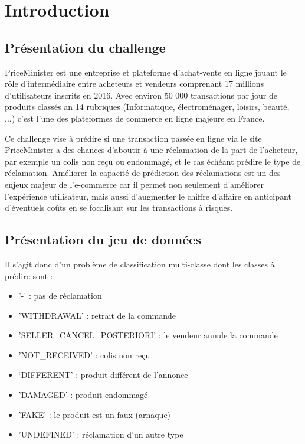 
\chapter{Introduction}

\section{Présentation du challenge}

PriceMinister est une entreprise et plateforme d'achat-vente en ligne jouant le rôle 
d'intermédiaire entre acheteurs et vendeurs comprenant 17 millions d'utilisateurs inscrits
en 2016. Avec environ 50 000 transactions par jour de produits classés an 14 rubriques 
(Informatique, électroménager, loisirs, beauté, ...) c'est l'une des plateformes de commerce
en ligne majeure en France. 

Ce challenge vise à prédire si une transaction passée en ligne via le site PriceMinister
a des chances d'aboutir à une réclamation de la part de l'acheteur, par exemple un colis 
non reçu ou endommagé, et le cas échéant prédire le type de réclamation. Améliorer la 
capacité de prédiction des réclamations est un des enjeux majeur de l'e-commerce car il 
permet non seulement d'améliorer l'expérience utilisateur, mais aussi d'augmenter le chiffre 
d'affaire en anticipant d'éventuels coûts en se focalisant sur les transactions à risques.

\section{Présentation du jeu de données}

Il s'agit donc d'un problème de classification multi-classe dont les classes à prédire sont :

\begin{itemize}
\item '-' : pas de réclamation
\item 'WITHDRAWAL' : retrait de la commande
\item 'SELLER_CANCEL_POSTERIORI' : le vendeur annule la commande
\item 'NOT_RECEIVED' : colis non reçu
\item ‘DIFFERENT' : produit différent de l'annonce
\item 'DAMAGED' : produit endommagé
\item 'FAKE' : le produit est un faux (arnaque)
\item 'UNDEFINED' : réclamation d'un autre type
\end{itemize}

